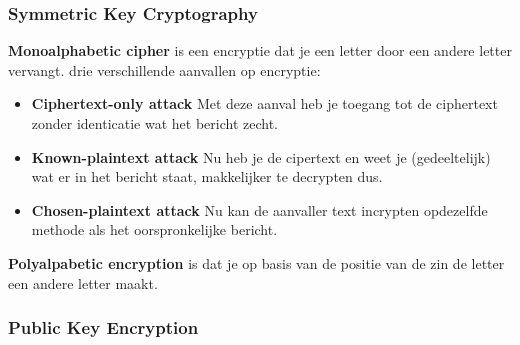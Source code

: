 \subsubsection{Symmetric Key Cryptography}
\textbf{Monoalphabetic cipher} is een encryptie dat je een letter door een andere letter vervangt.
drie verschillende aanvallen op encryptie:
\begin{itemize}
    \item \textbf{Ciphertext-only attack} Met deze aanval heb je toegang tot de ciphertext zonder identicatie wat het
    bericht zecht.
    \item \textbf{Known-plaintext attack} Nu heb je de cipertext en weet je (gedeeltelijk) wat er in het bericht
    staat, makkelijker te decrypten dus.
    \item \textbf{Chosen-plaintext attack} Nu kan de aanvaller text incrypten opdezelfde methode als het
    oorspronkelijke bericht.
\end{itemize}
\textbf{Polyalpabetic encryption} is dat je op basis van de positie van de zin de letter een andere letter maakt.

\subsubsection{Public Key Encryption}